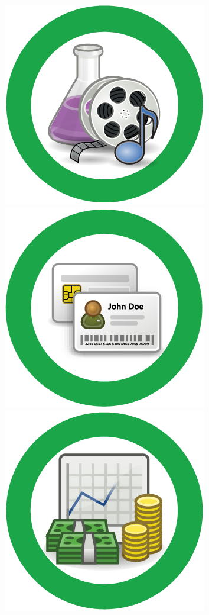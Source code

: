 \documentclass{letter}
\begin{document}
\includegraphics{stickers/sticker_ip}
\includegraphics{stickers/sticker_auth}
\includegraphics{stickers/sticker_financial}
\end{document}
